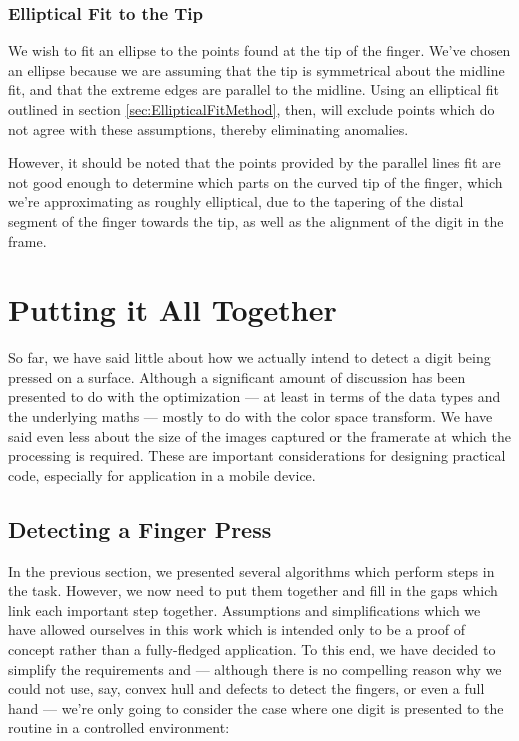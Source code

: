 \subsubsection{Elliptical Fit to the Tip}\label{sec:EllipticalFitToTheTip}

We wish to fit an ellipse to the points found at the tip of the finger. We've chosen an ellipse because we are assuming that the tip is symmetrical about the midline fit, and that the extreme edges are parallel to the midline. Using an elliptical fit outlined in section \ref{sec:EllipticalFitMethod}, then, will exclude points which do not agree with these assumptions, thereby eliminating anomalies.

However, it should be noted that the points provided by the parallel lines fit are not good enough to determine which parts on the curved tip of the finger, which we're approximating as roughly elliptical, due to the tapering of the distal segment of the finger towards the tip, as well as the alignment of the digit in the frame.


\section{Putting it All Together}\label{sec:PuttingItAllTogether}

So far, we have said little about how we actually intend to detect a digit being pressed on a surface. Although a significant amount of discussion has been presented to do with the optimization --- at least in terms of the data types and the underlying maths --- mostly to do with the color space transform. We have said even less about the size of the images captured or the framerate at which the processing is required. These are important considerations for designing practical code, especially for application in a mobile device.

\subsection{Detecting a Finger Press}\label{sec:DetectingAFingerPress}

In the previous section, we presented several algorithms which perform steps in the task. However, we now need to put them together and fill in the gaps which link each important step together. Assumptions and simplifications which we have allowed ourselves in this work which is intended only to be a proof of concept rather than a fully-fledged application. To this end, we have decided to simplify the requirements and --- although there is no compelling reason why we could not use, say, convex hull and defects to detect the fingers, or even a full hand --- we're only going to consider the case where one digit is presented to the routine in a controlled environment:

